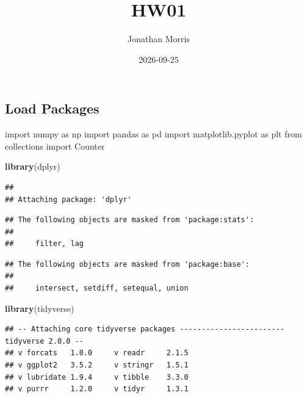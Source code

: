 \documentclass[
]{article}
\title{HW01}
\author{Jonathan Morris}
\date{2026-09-25}
\newenvironment{Shaded}{\begin{snugshade}}{\end{snugshade}}
\newcommand{\FunctionTok}[1]{\textcolor[rgb]{0.13,0.29,0.53}{\textbf{#1}}}
\newcommand{\ImportTok}[1]{#1}
\newcommand{\NormalTok}[1]{#1}
\begin{document}
\maketitle

\subsection{Load Packages}\label{load-packages}

\begin{Shaded}
\begin{Highlighting}[]
\ImportTok{import}\NormalTok{ numpy }\ImportTok{as}\NormalTok{ np}
\ImportTok{import}\NormalTok{ pandas }\ImportTok{as}\NormalTok{ pd}
\ImportTok{import}\NormalTok{ matplotlib.pyplot }\ImportTok{as}\NormalTok{ plt}
\ImportTok{from}\NormalTok{ collections }\ImportTok{import}\NormalTok{ Counter}
\end{Highlighting}
\end{Shaded}

\begin{Shaded}
\begin{Highlighting}[]
\FunctionTok{library}\NormalTok{(dplyr)}
\end{Highlighting}
\end{Shaded}

\begin{verbatim}
## 
## Attaching package: 'dplyr'
\end{verbatim}

\begin{verbatim}
## The following objects are masked from 'package:stats':
## 
##     filter, lag
\end{verbatim}

\begin{verbatim}
## The following objects are masked from 'package:base':
## 
##     intersect, setdiff, setequal, union
\end{verbatim}

\begin{Shaded}
\begin{Highlighting}[]
\FunctionTok{library}\NormalTok{(tidyverse)}
\end{Highlighting}
\end{Shaded}

\begin{verbatim}
## -- Attaching core tidyverse packages ------------------------ tidyverse 2.0.0 --
## v forcats   1.0.0     v readr     2.1.5
## v ggplot2   3.5.2     v stringr   1.5.1
## v lubridate 1.9.4     v tibble    3.3.0
## v purrr     1.2.0     v tidyr     1.3.1
\end{verbatim}
\end{document}
